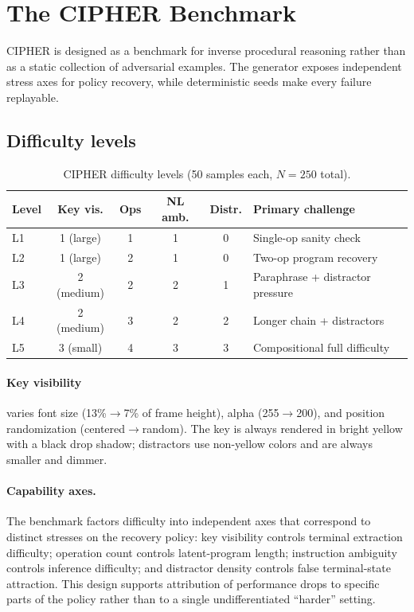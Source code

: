 \section{The CIPHER Benchmark}
\label{sec:benchmark}

CIPHER is designed as a benchmark for inverse procedural reasoning rather than
as a static collection of adversarial examples. The generator exposes
independent stress axes for policy recovery, while deterministic seeds make
every failure replayable.

\subsection{Difficulty levels}

\begin{table}[h]
\centering\small
\caption{CIPHER difficulty levels (50 samples each, $N{=}250$ total).}
\label{tab:levels}
\begin{tabular}{lccccp{4.5cm}}
\toprule
Level & Key vis. & Ops & NL amb. & Distr. & Primary challenge \\
\midrule
L1 & 1 (large)  & 1 & 1 & 0 & Single-op sanity check \\
L2 & 1 (large)  & 2 & 1 & 0 & Two-op program recovery \\
L3 & 2 (medium) & 2 & 2 & 1 & Paraphrase + distractor pressure \\
L4 & 2 (medium) & 3 & 2 & 2 & Longer chain + distractors \\
L5 & 3 (small)  & 4 & 3 & 3 & Compositional full difficulty \\
\bottomrule
\end{tabular}
\end{table}

\paragraph{Key visibility}
varies font size (13\%$\to$7\% of frame height), alpha (255$\to$200), and
position randomization (centered$\to$random). The key is always rendered in
bright yellow with a black drop shadow; distractors use non-yellow colors and
are always smaller and dimmer.

\paragraph{Capability axes.}
The benchmark factors difficulty into independent axes that correspond to
distinct stresses on the recovery policy: key visibility controls terminal
extraction difficulty; operation count controls latent-program length;
instruction ambiguity controls inference difficulty; and distractor density
controls false terminal-state attraction. This design supports attribution of
performance drops to specific parts of the policy rather than to a single
undifferentiated ``harder'' setting.


